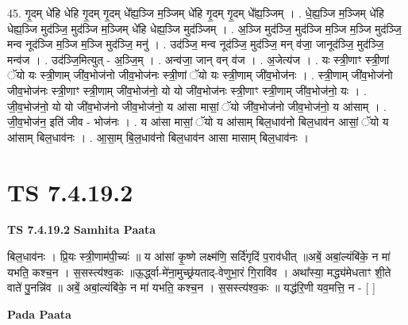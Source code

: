 \documentclass[17pt]{extarticle}
\begin{document}
45. गृ॒दम् धे॑हि धेहि गृ॒दम् गृ॒दम् धे᳚ह्य॒ञ्जि म॒ञ्जिम् धे॑हि गृ॒दम् गृ॒दम् धे᳚ह्य॒ञ्जिम् । . धे॒ह्य॒ञ्जि म॒ञ्जिम् धे॑हि धेह्य॒ञ्जि मुद॑ञ्जि॒ मुद॑ञ्जि म॒ञ्जिम् धे॑हि धेह्य॒ञ्जि मुद॑ञ्जिम् । . अ॒ञ्जि मुद॑ञ्जि॒ मुद॑ञ्जि म॒ञ्जि म॒ञ्जि मुद॑ञ्जि॒ मन्व नूद॑ञ्जि म॒ञ्जि म॒ञ्जि मुद॑ञ्जि॒ मनु॑ । . उद॑ञ्जि॒ मन्व नूद॑ञ्जि॒ मुद॑ञ्जि॒ मन् व॑जा॒ जानूद॑ञ्जि॒ मुद॑ञ्जि॒ मन्व॑ज । . उद॑ञ्जि॒मित्युत् - अ॒ञ्जि॒म् । . अन्व॑जा॒ जान् वन् व॑ज । . अ॒जेत्य॑ज । . यः स्त्री॒णाꣳ स्त्री॒णां ॅयो यः स्त्री॒णाम् जी॑व॒भोज॑नो जीव॒भोज॑नः स्त्री॒णां ॅयो यः स्त्री॒णाम् जी॑व॒भोज॑नः । . स्त्री॒णाम् जी॑व॒भोज॑नो जीव॒भोज॑नः स्त्री॒णाꣳ स्त्री॒णाम् जी॑व॒भोज॑नो॒ यो यो जी॑व॒भोज॑नः स्त्री॒णाꣳ स्त्री॒णाम् जी॑व॒भोज॑नो॒ यः । . जी॒व॒भोज॑नो॒ यो यो जी॑व॒भोज॑नो जीव॒भोज॑नो॒ य आ॑सा मासां॒ ॅयो जी॑व॒भोज॑नो जीव॒भोज॑नो॒ य आ॑साम् । . जी॒व॒भोज॑न॒ इति॑ जीव - भोज॑नः । . य आ॑सा मासां॒ ॅयो य आ॑साम् बिल॒धाव॑नो बिल॒धाव॑न आसां॒ ॅयो य आ॑साम् बिल॒धाव॑नः । . आ॒सा॒म् बि॒ल॒धाव॑नो बिल॒धाव॑न आसा मासाम् बिल॒धाव॑नः । \newline
\pagebreak
{}

\section{ TS 7.4.19.2 }

\textbf{TS 7.4.19.2 } \newline
\textbf{Samhita Paata} \newline

बिल॒धाव॑नः । प्रि॒यः स्त्री॒णाम॑पी॒च्यः॑ ॥ य आ॑सां कृ॒ष्णे लक्ष्म॑णि॒ सर्दि॑गृदिं प॒राव॑धीत् ॥अबें॒ अबां॒ल्यंबि॑के॒ न मा॑ यभति॒ कश्च॒न । स॒सस्त्य॑श्व॒कः ॥ऊ॒र्द्ध्वा-मे॑ना॒मुच्छ्र॑यताद्-वेणुभा॒रं गि॒रावि॑व । अथा᳚स्या॒ मद्ध्य॑मेधताꣳ शी॒ते वाते॑ पु॒नन्नि॑व ॥ अबें॒ अबां॒ल्यंबि॑के॒ न मा॑ यभति॒ कश्च॒न । स॒सस्त्य॑श्व॒कः ॥ यद्ध॑रि॒णी यव॒मत्ति॒ न - [  ] \newline

\textbf{Pada Paata} \newline
\end{document}
